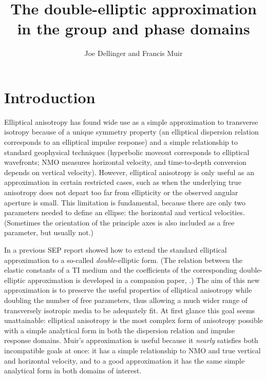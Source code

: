 
\title{The double-elliptic approximation \\ in the group and phase domains}
\author{Joe Dellinger and Francis Muir}

\maketitle

\section{Introduction}
Elliptical anisotropy has found wide use as a simple approximation
to transverse isotropy because of a unique symmetry property
(an elliptical dispersion relation corresponds to an elliptical
impulse response) and a simple relationship to standard geophysical
techniques (hyperbolic moveout corresponds to elliptical wavefronts;
NMO measures horizontal velocity, and time-to-depth conversion
depends on vertical velocity).
However, elliptical anisotropy is only useful as an approximation
in certain restricted cases, such as when the underlying true anisotropy
does not depart too far from ellipticity
or the observed angular aperture is small.
This limitation is fundamental, because there are only two parameters
needed to define an ellipse: the horizontal and vertical velocities.
(Sometimes the orientation of the principle axes is also included as a
free parameter, but usually not.)

In a previous SEP report \cite{Muir.sep.67.41} showed how to extend the standard
elliptical approximation to a so-called {\em double\/}-elliptic form. (The 
relation between the elastic constants of a TI medium 
and the coefficients of the corresponding
double-elliptic approximation is
developed in a companion paper, \cite[]{Muir.sep.70.367}.)
The aim of this new approximation is to preserve the useful properties
of elliptical anisotropy while doubling the number of free parameters,
thus allowing a much wider range of transversely isotropic media to
be adequately fit.
At first glance this goal seems unattainable: elliptical anisotropy 
is the most complex form of anisotropy possible with a simple analytical form 
in both the dispersion relation and impulse response domains.
Muir's approximation is useful because it {\em nearly\/} satisfies
both incompatible goals at once:
it has a simple relationship to NMO and
true vertical and horizontal velocity, and to a good approximation
it has the same simple analytical form in both domains of interest.

